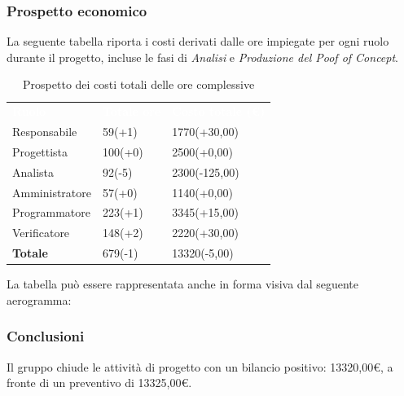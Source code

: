 \subsubsection{Prospetto economico}
La seguente tabella riporta i costi derivati dalle ore impiegate per ogni ruolo durante il progetto, incluse le fasi di \textit{Analisi} e \textit{Produzione del Poof of Concept}.

\begin{table}[H]
\begin{center}
\renewcommand{\arraystretch}{1.5}
\begin{tabular}{ m{}<{\centering}  m{}<{\centering} m{}<{\centering}}
	\rowcolor{darkblue}
	\textcolor{white}{\textbf{Ruolo}}&\textcolor{white}{\textbf{Totale ore}}&\textcolor{white}{\textbf{Costo totale (\euro)}}\\ 

	Responsabile & 59(+1) & 1770(+30,00) \\	
	
	Progettista & 100(+0) & 2500(+0,00) \\
	
	Analista & 92(-5) & 2300(-125,00) \\

	Amministratore & 57(+0) & 1140(+0,00) \\
	
	Programmatore & 223(+1) & 3345(+15,00) \\
	
	Verificatore & 148(+2) & 2220(+30,00) \\
	
	\textbf{Totale} & 679(-1) & 13320(-5,00) \\
	
\end{tabular}
\caption{Prospetto dei costi totali delle ore complessive}
\end{center}
\end{table}

La tabella può essere rappresentata anche in forma visiva dal seguente aerogramma:

\subsubsection{Conclusioni}
Il gruppo chiude le attività di progetto con un bilancio positivo: 13320,00\euro, a fronte di un preventivo di 13325,00\euro. \\

